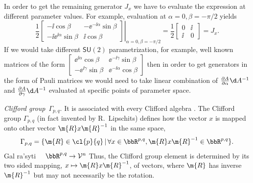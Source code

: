 \begin{example}
\begin{example}
In order to get the remaining generator $J_x$ we have to evaluate
the  expression at different parameter values. For example,
evaluation at $\alpha=0, \beta=-\pi/2$ yields
\[\frac12\left.\begin{bmatrix}-\ii\cos\beta&-\ee^{-\ii \alpha}\sin\beta\\-\ii \ee^{\ii \alpha}\sin\beta&\ii\cos\beta\end{bmatrix}\right|_{\alpha=0,\beta=-\pi/2}=\frac12\begin{bmatrix}0&\ii\\\ii&0\end{bmatrix}=J_x
.\] If we would take different $\mathsf{SU}(2)$ parametrization,
for example,  well known matrices of the form
$\begin{bmatrix}\ee^{\ii \alpha}\cos\beta&\ee^{-\ii \gamma}\sin\beta\\
-\ee^{\ii \gamma}\sin\beta&\ee^{-\ii
\alpha}\cos\beta\end{bmatrix}$ then in order to get generators in
the form of Pauli matrices we would need to take linear
combination of $\frac{\partial A}{\partial \alpha}\d A^{-1}$ and
$\frac{\partial A}{\partial \gamma}\d A^{-1}$  evaluated at
specific points of parameter space.
 \end{example}


\begin{unit} \textit{Clifford group}~$\Gamma_{p,q}$. It is associated with every
  Clifford algebra . The Clifford  group
$\Gamma_{p,q}$ (in fact invented by R.~Lipschits)  defines how the
vector $x$ is mapped onto other vector $\m{R}x\m{R}^{-1}$ in the
same space,
\[\Gamma_{p,q}=\{\m{R}\in\cl{p}{q}\,|\,\forall x\in\bbR^{p,q},
\m{R}x\m{R}^{-1}\in\bbR^{p,q}\}.\] Gal ra'syti $\quad
\bbR^{p,q}\rightarrow\mathcal{V}^n$ Thus, the Clifford group
element is determined by its two sided mapping, $x\mapsto
\m{R}x\m{R}^{-1}$, of vectors, where $\m{R}$ has inverse
$\m{R}^{-1}$ but may not necessarily be the rotation.
\end{unit}


\end{example}
